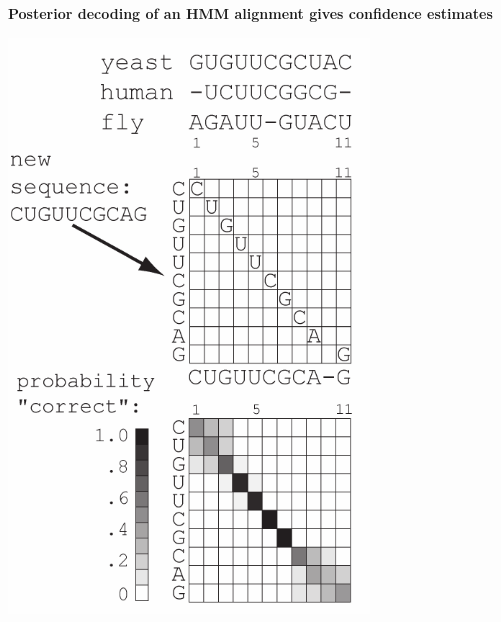 \documentclass[landscape]{slides}
\begin{document}
\begin{slide}
\begin{center}

\textbf{Posterior decoding of an HMM alignment gives confidence estimates}

\includegraphics[height=6in]{figs/hmm_alignment2_layer3}
\end{center}

\vfill
\end{slide}
\end{document}
